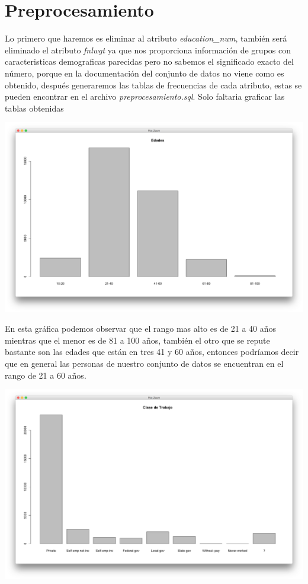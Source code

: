 \documentclass{article}
\begin{document}
\section{Preprocesamiento}
  Lo primero que haremos es eliminar al atributo {\it education\_num}, también será eliminado el atributo {\it fnlwgt} ya que nos proporciona información de grupos con caracteristicas demograficas parecidas pero no sabemos el significado exacto del número, porque en la documentación del conjunto de datos no viene como es obtenido, después generaremos las tablas de frecuencias de cada atributo, estas se pueden encontrar en el archivo {\it preprocesamiento.sql}. Solo faltaria graficar las tablas obtenidas
  \begin{center}
    \hbox{\hspace{-5.5em}\includegraphics[scale=0.4]{graficas/edadesP}}
  \end{center}
  En esta gráfica podemos observar que el rango mas alto es de 21 a 40 años mientras que el menor es de 81 a 100 años, también el otro que se repute bastante son las edades que están en tres 41 y 60 años, entonces podríamos decir que en general las personas de nuestro conjunto de datos se encuentran en el rango de 21 a 60 años.
  \begin{center}
    \hbox{\hspace{-5.5em}\includegraphics[scale=0.4]{graficas/workclassP}}
  \end{center}
\end{document}
